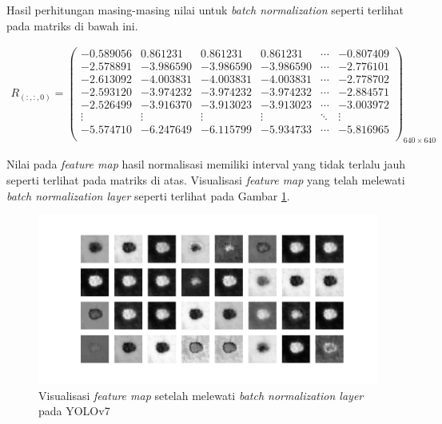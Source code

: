     Hasil perhitungan masing-masing nilai untuk \textit{batch normalization} seperti terlihat pada matriks di bawah ini.

    \begin{align*}
        R_{(:, :, 0)} = 
        \begin{pmatrix}
            -0.589056 & 0.861231  & 0.861231  & 0.861231  & \cdots & -0.807409 \\
            -2.578891 & -3.986590 & -3.986590 & -3.986590 & \cdots & -2.776101 \\
            -2.613092 & -4.003831 & -4.003831 & -4.003831 & \cdots & -2.778702 \\
            -2.593120 & -3.974232 & -3.974232 & -3.974232 & \cdots & -2.884571 \\
            -2.526499 & -3.916370 & -3.913023 & -3.913023 & \cdots & -3.003972 \\
            \vdots    & \vdots    & \vdots    & \vdots    & \ddots & \vdots \\
            -5.574710 & -6.247649 & -6.115799 & -5.934733 & \cdots & -5.816965 \\
        \end{pmatrix}_{640\times 640}
    \end{align*}

    Nilai pada \textit{feature map} hasil normalisasi memiliki interval yang tidak terlalu jauh seperti terlihat pada matriks di atas. Visualisasi \textit{feature map} yang telah melewati \textit{batch normalization layer} seperti terlihat pada Gambar \ref{fig:d-banorm}.

    \begin{figure}[H]
        \begin{center}
            \includegraphics[width=12cm]{img/bab4/bn-layer.png}
            \caption{Visualisasi \textit{feature map} setelah melewati \textit{batch normalization layer} pada YOLOv7}
            \label{fig:d-banorm}
        \end{center}
    \end{figure}


